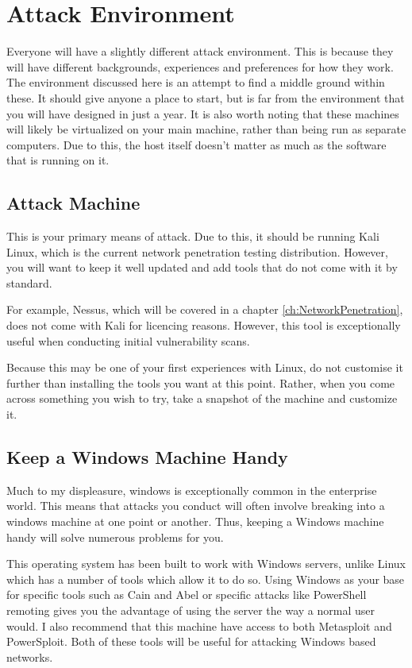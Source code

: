 	\section{Attack Environment}
		Everyone will have a slightly different attack environment. 
		This is because they will have different backgrounds, experiences and preferences for how they work. 
		The environment discussed here is an attempt to find a middle ground within these. 
		It should give anyone a place to start, but is far from the environment that you will have designed in just a year. 
		It is also worth noting that these machines will likely be virtualized on your main machine, rather than being run as separate computers\cite{playbook}.  
		Due to this, the host itself doesn't matter as much as the software that is running on it. 

		\subsection{Attack Machine}
			This is your primary means of attack. 
			Due to this, it should be running Kali Linux, which is the current network penetration testing distribution. 
			However, you will want to keep it well updated and add tools that do not come with it by standard. 

			For example, Nessus, which will be covered in a chapter \ref{ch:NetworkPenetration}, 
			does not come with Kali for licencing reasons. 
			However, this tool is exceptionally useful when conducting initial vulnerability scans. 

			Because this may be one of your first experiences with Linux, do not customise it further than installing the tools you want at this point. 
			Rather, when you come across something you wish to try, take a snapshot of the machine and customize it. 

		\subsection{Keep a Windows Machine Handy}
			Much to my displeasure, windows is exceptionally common in the enterprise world. 
			This means that attacks you conduct will often involve breaking into a windows machine at one point or another. 
			Thus, keeping a Windows machine handy will solve numerous problems for you. 
			
			This operating system has been built to work with Windows servers, unlike Linux which has a number of tools which allow it to do so. 
			Using Windows as your base for specific tools such as Cain and Abel or specific attacks like PowerShell remoting gives you the advantage of using the server the way a normal user would. 
			I also recommend that this machine have access to both Metasploit and PowerSploit. 
			Both of these tools will be useful for attacking Windows based networks. 

